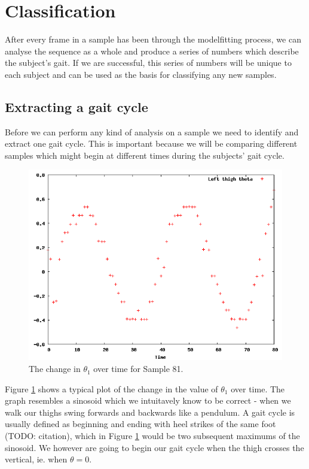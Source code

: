 \section{Classification}

After every frame in a sample has been through the modelfitting process, we can analyse the sequence as a whole
and produce a series of numbers which describe the subject's gait.
If we are successful, this series of numbers will be unique to each subject and can be used as the basis for classifying any new samples.


\subsection{Extracting a gait cycle}

Before we can perform any kind of analysis on a sample we need to identify and extract one gait cycle.
This is important because we will be comparing different samples which might begin at different times during the subjects' gait cycle.

\begin{figure}[tb]
	\centering
	\includegraphics[width=\textwidth]{curvefitting.png}
	\caption{The change in $\theta_1$ over time for Sample 81.}
	\label{CurveFitting1}
\end{figure}

Figure \ref{CurveFitting1} shows a typical plot of the change in the value of $\theta_1$ over time.
The graph resembles a sinosoid which we intuitavely know to be correct - when we walk our thighs swing forwards and backwards like a pendulum.
A gait cycle is usually defined as beginning and ending with heel strikes of the same foot (TODO: citation), which in Figure \ref{CurveFitting1} would be two subsequent maximums of the sinosoid.
We however are going to begin our gait cycle when the thigh crosses the vertical, ie. when $\theta = 0$.

